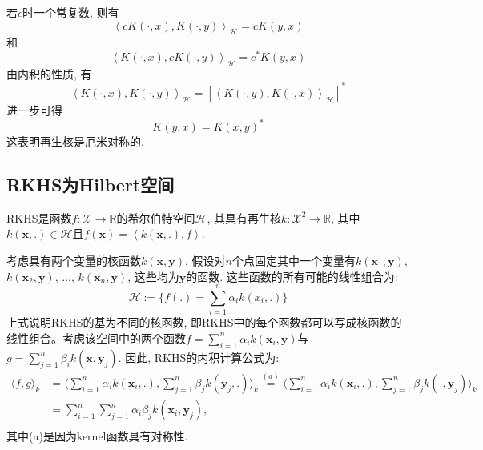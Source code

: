 \documentclass[lang=cn,10pt]{gorgeousnbook}
\numberwithin{equation}{section}%
\numberwithin{figure}{section}%
\begin{document}
若$c$时一个常复数, 则有
\begin{equation}
\left< cK\left( \cdot ,x \right) ,K\left( \cdot ,y \right) \right> _{\mathcal{H}}=cK\left( y,x \right) 
\end{equation}
和
\begin{equation}
\left< K\left( \cdot ,x \right) ,cK\left( \cdot ,y \right) \right> _{\mathcal{H}}=c^*K\left( y,x \right) 
\end{equation}
由内积的性质, 有
\begin{equation}
\left< K\left( \cdot ,x \right) ,K\left( \cdot ,y \right) \right> _{\mathcal{H}}=\left[ \left< K\left( \cdot ,y \right) ,K\left( \cdot ,x \right) \right> _{\mathcal{H}} \right] ^*
\end{equation}
进一步可得
\begin{equation}
K\left( y,x \right) =K\left( x,y \right) ^*
\end{equation}
这表明再生核是厄米对称的. 

\subsection{RKHS为Hilbert空间}
\begin{theorem}
    RKHS是函数$f:\mathcal{X}\rightarrow \mathbb{R}$的希尔伯特空间$\mathcal{H}$, 其具有再生核$k: \mathcal{X}^2\rightarrow \mathbb{R}$, 其中$k(\bm{x},.)\in\mathcal{H}$且$f(\bm{x}) = \left< k(\bm{x},.),f \right> $.
\end{theorem}

考虑具有两个变量的核函数$k(\bm{x},\bm{y})$, 假设对$n$个点固定其中一个变量有$k(\bm{x}_1,\bm{y})$, $k(\bm{x}_2,\bm{y})$, $\ldots$, $k(\bm{x}_n,\bm{y})$, 这些均为$\bm{y}$的函数. 这些函数的所有可能的线性组合为:
\begin{equation}
    \mathcal{H}:=\Big\{f(.)=\sum_{i=1}^n\alpha_ik(x_i,.)\Big\}
\end{equation}
上式说明RKHS的基为不同的核函数, 即RKHS中的每个函数都可以写成核函数的线性组合。考虑该空间中的两个函数$f=\sum\nolimits_{i=1}^n{\alpha _ik\left( \boldsymbol{x}_i,\boldsymbol{y} \right)}$与$g=\sum\nolimits_{j=1}^n{\beta _ik\left( \boldsymbol{x},\boldsymbol{y}_j \right)}$. 因此, RKHS的内积计算公式为:
\begin{equation}
    \begin{aligned}
\langle f,g\rangle_{k}& =\Big\langle\sum_{i=1}^{n}\alpha_{i}k(\boldsymbol{x}_{i},.),\sum_{j=1}^{n}\beta_{j}k(\boldsymbol{y}_{j},.)\Big\rangle_{k}\stackrel{(a)}{=}\Big\langle\sum_{i=1}^{n}\alpha_{i}k(\boldsymbol{x}_{i},.),\sum_{j=1}^{n}\beta_{j}k(.,\boldsymbol{y}_{j})\Big\rangle_{k}  \\
&=\sum_{i=1}^{n}\sum_{j=1}^{n}\alpha_{i}\beta_{j}k(\boldsymbol{x}_{i},\boldsymbol{y}_{j}), \\
\end{aligned}
\end{equation}
其中(a)是因为kernel函数具有对称性. 
\end{document}
